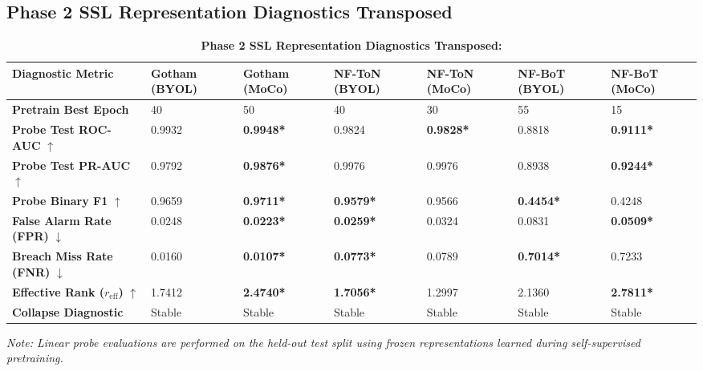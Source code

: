 \documentclass[10pt,a4paper]{article}
\newcommand{\best}[1]{\textbf{\textcolor{bestgreen}{#1*}}}
\begin{document}
\subsection{Phase 2 SSL Representation Diagnostics Transposed}
\begin{table}[htbp]
\centering
\small
\caption{\textbf{Phase 2 SSL Representation Diagnostics Transposed:}}
\begin{tabularx}{\textwidth}{lXXXXXX}
\toprule
\textbf{Diagnostic Metric} & \textbf{Gotham (BYOL)} & \textbf{Gotham (MoCo)} & \textbf{NF-ToN (BYOL)} & \textbf{NF-ToN (MoCo)} & \textbf{NF-BoT (BYOL)} & \textbf{NF-BoT (MoCo)} \\
\midrule
\textbf{Pretrain Best Epoch} & 40 & 50 & 40 & 30 & 55 & 15 \\
\textbf{Probe Test ROC-AUC} $\uparrow$ & 0.9932 & \best{0.9948} & 0.9824 & \best{0.9828} & 0.8818 & \best{0.9111} \\
\textbf{Probe Test PR-AUC} $\uparrow$ & 0.9792 & \best{0.9876} & 0.9976 & 0.9976 & 0.8938 & \best{0.9244} \\
\textbf{Probe Binary F1} $\uparrow$ & 0.9659 & \best{0.9711} & \best{0.9579} & 0.9566 & \best{0.4454} & 0.4248 \\
\textbf{False Alarm Rate (FPR)} $\downarrow$ & 0.0248 & \best{0.0223} & \best{0.0259} & 0.0324 & 0.0831 & \best{0.0509} \\
\textbf{Breach Miss Rate (FNR)} $\downarrow$ & 0.0160 & \best{0.0107} & \best{0.0773} & 0.0789 & \best{0.7014} & 0.7233 \\
\textbf{Effective Rank ($r_{\text{eff}}$)} $\uparrow$ & 1.7412 & \best{2.4740} & \best{1.7056} & 1.2997 & 2.1360 & \best{2.7811} \\
\textbf{Collapse Diagnostic} & Stable & Stable & Stable & Stable & Stable & Stable \\
\bottomrule
\end{tabularx}
\vspace{2pt}
\noindent\textit{Note: Linear probe evaluations are performed on the held-out test split using frozen representations learned during self-supervised pretraining.}
\label{tab:ssl_transposed2}
\end{table}
\end{document}
